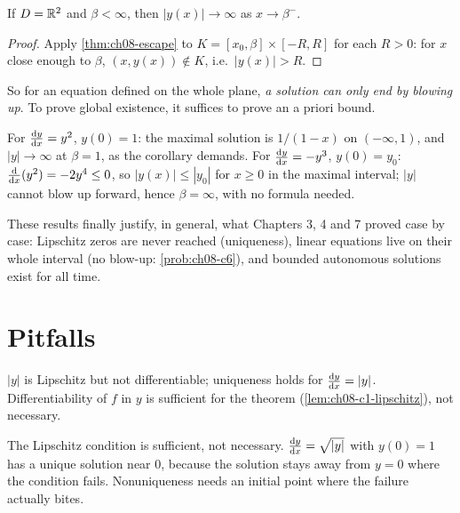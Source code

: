 \begin{corollary}\label{cor:ch08-blowup}
If $D = \mathbb{R}^2$ and $\beta<\infty$, then $|y(x)|\to\infty$ as $x\to\beta^-$.
\end{corollary}
\begin{proof}
Apply \cref{thm:ch08-escape} to $K = [x_0,\beta]\times[-R,R]$ for each $R>0$:
for $x$ close enough to $\beta$, $(x,y(x))\notin K$, i.e.\ $|y(x)|>R$.
\end{proof}

So for an equation defined on the whole plane, \emph{a solution can only end by
blowing up}. To prove global existence, it suffices to prove an a priori bound.

\begin{example}\label{ex:ch08-alternative}
For $\frac{\mathrm{d}y}{\mathrm{d}x} = y^2$, $y(0) = 1$: the maximal solution is $1/(1-x)$ on
$(-\infty,1)$, and $|y|\to\infty$ at $\beta = 1$, as the corollary demands.
For $\frac{\mathrm{d}y}{\mathrm{d}x} = -y^3$, $y(0) = y_0$: $\frac{\mathrm{d}}{\mathrm{d}x}(y^2) = -2y^4\le0$, so
$|y(x)|\le|y_0|$ for $x\ge0$ in the maximal interval; $|y|$ cannot blow up
forward, hence $\beta = \infty$, with no formula needed.
\end{example}

These results finally justify, in general, what Chapters 3, 4 and 7 proved
case by case: Lipschitz zeros are never reached (uniqueness), linear equations
live on their whole interval (no blow-up: \cref{prob:ch08-c6}), and bounded
autonomous solutions exist for all time.

\section{Pitfalls}\label{sec:ch08-pitfalls}

\begin{pitfall}\label{pit:ch08-lip-diff}
$|y|$ is Lipschitz but not differentiable; uniqueness holds for
$\frac{\mathrm{d}y}{\mathrm{d}x} = |y|$. Differentiability of $f$ in $y$ is sufficient for the
theorem (\cref{lem:ch08-c1-lipschitz}), not necessary.
\end{pitfall}

\begin{pitfall}\label{pit:ch08-not-converse}
The Lipschitz condition is sufficient, not necessary. $\frac{\mathrm{d}y}{\mathrm{d}x} = \sqrt{|y|}$
with $y(0) = 1$ has a unique solution near $0$, because the solution stays
away from $y = 0$ where the condition fails. Nonuniqueness needs an initial
point where the failure actually bites.
\end{pitfall}

